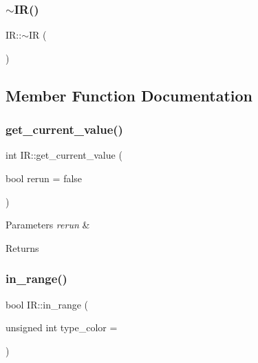 \mbox{\label{class_i_r_acc2e758f018c7b069315a826e9ca3043}} 
\subsubsection{\texorpdfstring{$\sim$\+I\+R()}{~IR()}}
{\footnotesize\ttfamily I\+R\+::$\sim$\+IR (\begin{DoxyParamCaption}{ }\end{DoxyParamCaption})}



\subsection{Member Function Documentation}
\mbox{\label{class_i_r_a5b71d10f57e8dbb76cdf01e043cfdda1}} 
\subsubsection{\texorpdfstring{get\+\_\+current\+\_\+value()}{get\_current\_value()}}
{\footnotesize\ttfamily int I\+R\+::get\+\_\+current\+\_\+value (\begin{DoxyParamCaption}\item[{bool}]{rerun = {\ttfamily false} }\end{DoxyParamCaption})}


\begin{DoxyParams}{Parameters}
{\em rerun} & \\
\hline
\end{DoxyParams}
\begin{DoxyReturn}{Returns}

\end{DoxyReturn}
\mbox{\label{class_i_r_a388cfd7a959fa4a24d8e2bad1e9d95d5}} 
\subsubsection{\texorpdfstring{in\+\_\+range()}{in\_range()}}
{\footnotesize\ttfamily bool I\+R\+::in\+\_\+range (\begin{DoxyParamCaption}\item[{unsigned int}]{type\+\_\+color = {} }\end{DoxyParamCaption})}


